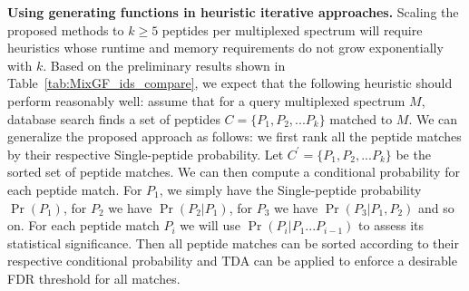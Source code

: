 \documentclass[arial,11pt]{article}
\begin{document}
{\bf Using generating functions in heuristic iterative approaches.} Scaling the proposed methods to $k\geq5$ peptides per multiplexed spectrum will require heuristics whose runtime and memory requirements do not grow exponentially with $k$. Based on the preliminary results shown in Table~\ref{tab:MixGF_ids_compare}, we expect that the following heuristic should perform reasonably well: assume that for a query multiplexed spectrum $M$, database search finds a set of peptides $C=\{P_{1}, P_{2}, ... P_{k}\}$ matched to $M$. We can generalize the proposed approach as follows: we first rank all the peptide matches by their respective Single-peptide probability. Let $C^{'} = \{P_{1}, P_{2}, ... P_{k}\}$ be the sorted set of peptide matches. We can then compute a conditional probability for each peptide match. For $P_{1}$, we simply have the Single-peptide probability $\Pr(P_{1})$, for $P_{2}$ we have $\Pr(P_{2}|P_{1})$, for $P_{3}$ we have $\Pr(P_{3} | P_{1}, P_{2})$ and so on.  For each peptide match $P_{i}$ we will use $\Pr(P_{i}|P_{1} ... P_{i-1})$ to assess its statistical significance.  Then all peptide matches can be sorted according to their respective conditional probability and TDA can be applied to enforce a desirable FDR threshold for all matches.
\end{document}
